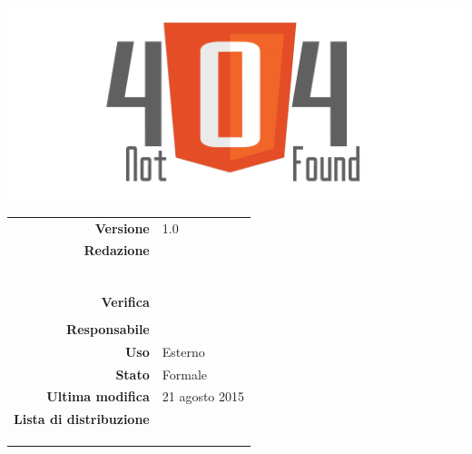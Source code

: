 \thispagestyle{empty}

\begin{titlepage}

	\begin{center}
	\begin{Huge}
		\textbf{\gruppo} \\
	\end{Huge}
	\vspace{0.5cm}
	\begin{Large}
		\textbf{\capitolato}
	\end{Large}
	
	\vspace{1cm}

	\includegraphics[scale=0.35]{../logo/logo404_Extends.png}
	\vspace{1cm}
	\begin{Huge}
		\textbf{\titDoc}
	\end{Huge}
	
	\vspace{1cm}
	
	\begin{table}[h]
	\begin{center}
	\begin{tabular}{r | l}
		\textbf{Versione} & 1.0 \\
		\textbf{Redazione} & \GoIs \\ 
			& \ReAn \\ 
			& \VeFe \\
			& \MaMo \\
			& \DeEn \\
			& \CoMa \\
			& \CaMa \\
		\textbf{Verifica} & \VeFe \\ 
			& \CaMa \\ 
		\textbf{Responsabile} &\CoMa \\
		\textbf{Uso} & Esterno \\
		\textbf{Stato} & Formale \\
		\textbf{Ultima modifica} & 21 agosto 2015 \\
		\textbf{Lista di distribuzione} & \gruppo \\ 
			& \Vardanega \\
			& \Cardin \\
			& \Zucchetti \\
	\end{tabular}
	\end{center}
	\end{table}
	\end{center}
\end{titlepage}